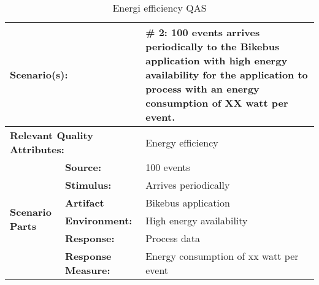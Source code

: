 \begin{table}[H]
\begin{center}
\begin{tabular}{|p{0.3cm}|p{2.5cm}|p{8cm}|}
  \hline
  \multicolumn{2}{|p{3cm}|}{\bfseries Scenario(s):} & \#  2: 100  events arrives periodically to the Bikebus application with high energy availability for the application to process with an energy consumption of  XX watt per event. \\
  \hline
  \multicolumn{2}{|p{3cm}|}{\bfseries Relevant Quality Attributes:} & Energy efficiency\\
  \hline
  \multirow{6}{*}{\begin{sideways}{\bfseries Scenario Parts}\end{sideways}}
  & {\bfseries Source:} & 100 events \\
  \cline{2-3}
  & {\bfseries Stimulus:} & Arrives periodically \\
  \cline{2-3}
  & {\bfseries Artifact} &  Bikebus application \\
  \cline{2-3}
  & {\bfseries Environment:} &  High energy availability \\
  \cline{2-3}
  & {\bfseries Response:} &  Process data\\
  \cline{2-3}
  & {\bfseries Response Measure:} & Energy consumption of xx watt per event \\
  \hline
\end{tabular}
\caption{Energi efficiency QAS}
\end{center}
\end{table}





